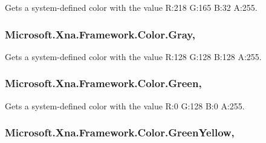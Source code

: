 Gets a system-\/defined color with the value R\+:218 G\+:165 B\+:32 A\+:255.

\hypertarget{struct_microsoft_1_1_xna_1_1_framework_1_1_color_ae5d0877962ff9a4291bb15929200bfea}{}
\subsubsection[{Gray}]{ Microsoft.\+Xna.\+Framework.\+Color.\+Gray\hspace{0.3cm}{\ttfamily [static]}, {\ttfamily [get]}}\label{struct_microsoft_1_1_xna_1_1_framework_1_1_color_ae5d0877962ff9a4291bb15929200bfea}


Gets a system-\/defined color with the value R\+:128 G\+:128 B\+:128 A\+:255.

\hypertarget{struct_microsoft_1_1_xna_1_1_framework_1_1_color_a10be5216ccd44b7074cf42e2fd55771b}{}
\subsubsection[{Green}]{ Microsoft.\+Xna.\+Framework.\+Color.\+Green\hspace{0.3cm}{\ttfamily [static]}, {\ttfamily [get]}}\label{struct_microsoft_1_1_xna_1_1_framework_1_1_color_a10be5216ccd44b7074cf42e2fd55771b}


Gets a system-\/defined color with the value R\+:0 G\+:128 B\+:0 A\+:255.

\hypertarget{struct_microsoft_1_1_xna_1_1_framework_1_1_color_a3db57006284571a2aa4656749a70f852}{}
\subsubsection[{Green\+Yellow}]{ Microsoft.\+Xna.\+Framework.\+Color.\+Green\+Yellow\hspace{0.3cm}{\ttfamily [static]}, {\ttfamily [get]}}\label{struct_microsoft_1_1_xna_1_1_framework_1_1_color_a3db57006284571a2aa4656749a70f852}


